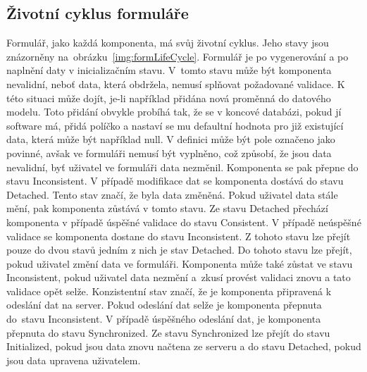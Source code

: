 \subsection{Životní cyklus formuláře}
Formulář, jako každá komponenta, má svůj životní cyklus. Jeho stavy jsou znázorněny na~obrázku~\ref{img:formLifeCycle}. Formulář je po vygenerování a po naplnění daty v inicializačním stavu. V~tomto stavu může být komponenta nevalidní, neboť data, která obdržela, nemusí splňovat požadované validace. K této situaci může dojít, je-li například přidána nová proměnná do datového modelu. Toto přidání obvykle probíhá tak, že se v koncové databázi, pokud jí software má, přidá políčko a nastaví se mu defaultní hodnota pro již existující data, která může být například null. V definici může být pole označeno jako povinné, avšak ve formuláři nemusí být vyplněno, což způsobí, že jsou data nevalidní, byť uživatel ve formuláři data nezměnil. Komponenta se pak přepne do stavu Inconsistent. V případě modifikace dat se komponenta dostává do stavu Detached. Tento stav značí, že byla data změněná. Pokud uživatel data stále mění, pak komponenta zůstává v tomto stavu. Ze stavu Detached přechází komponenta v případě úspěšné validace do stavu Consistent. V případě neúspěšné validace se komponenta dostane do stavu Inconsistent. Z tohoto stavu lze přejít pouze do dvou stavů jedním z nich je stav Detached. Do tohoto stavu lze přejít, pokud uživatel změní data ve formuláři. Komponenta může také zůstat ve stavu Inconsistent, pokud uživatel data nezmění a~zkusí provést validaci znovu a tato validace opět selže. Konzistentní stav značí, že je komponenta připravená k odeslání dat na server. Pokud odeslání dat selže je komponenta přepnuta do~stavu Inconsistent. V případě úspěšného odeslání dat, je komponenta přepnuta do stavu Synchronized. Ze stavu Synchronized lze přejít do stavu Initialized, pokud jsou data znovu načtena ze serveru a do stavu Detached, pokud jsou data upravena uživatelem.

